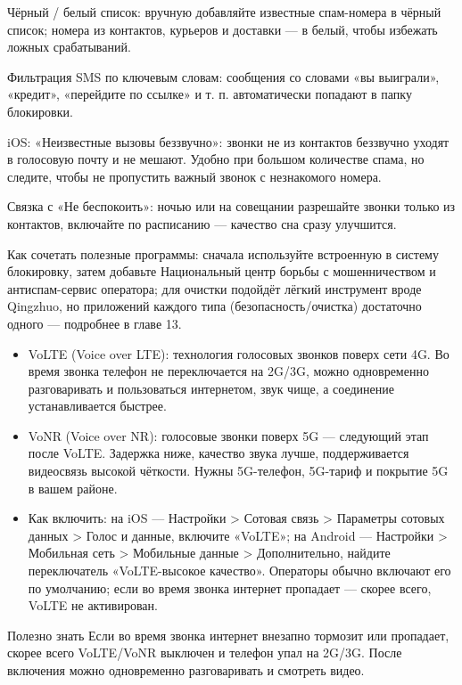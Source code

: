 Чёрный / белый список: вручную добавляйте известные спам-номера в чёрный список; номера из контактов, курьеров и доставки — в белый, чтобы избежать ложных срабатываний.

Фильтрация SMS по ключевым словам: сообщения со словами «вы выиграли», «кредит», «перейдите по ссылке» и т. п. автоматически попадают в папку блокировки.

iOS: «Неизвестные вызовы беззвучно»: звонки не из контактов беззвучно уходят в голосовую почту и не мешают. Удобно при большом количестве спама, но следите, чтобы не пропустить важный звонок с незнакомого номера.

Связка с «Не беспокоить»: ночью или на совещании разрешайте звонки только из контактов, включайте по расписанию — качество сна сразу улучшится.

Как сочетать полезные программы: сначала используйте встроенную в систему блокировку, затем добавьте Национальный центр борьбы с мошенничеством и антиспам-сервис оператора; для очистки подойдёт лёгкий инструмент вроде Qingzhuo, но приложений каждого типа (безопасность/очистка) достаточно одного — подробнее в главе 13.


\begin{itemize}
  \item VoLTE (Voice over LTE): технология голосовых звонков поверх сети 4G. Во время звонка телефон не переключается на 2G/3G, можно одновременно разговаривать и пользоваться интернетом, звук чище, а соединение устанавливается быстрее.
  \item VoNR (Voice over NR): голосовые звонки поверх 5G — следующий этап после VoLTE. Задержка ниже, качество звука лучше, поддерживается видеосвязь высокой чёткости. Нужны 5G-телефон, 5G-тариф и покрытие 5G в вашем районе.
  \item Как включить: на iOS — Настройки > Сотовая связь > Параметры сотовых данных > Голос и данные, включите «VoLTE»; на Android — Настройки > Мобильная сеть > Мобильные данные > Дополнительно, найдите переключатель «VoLTE-высокое качество». Операторы обычно включают его по умолчанию; если во время звонка интернет пропадает — скорее всего, VoLTE не активирован.
\end{itemize}

\begin{tcbinfo}{Полезно знать}
Если во время звонка интернет внезапно тормозит или пропадает, скорее всего VoLTE/VoNR выключен и телефон упал на 2G/3G. После включения можно одновременно разговаривать и смотреть видео.

\end{tcbinfo}

